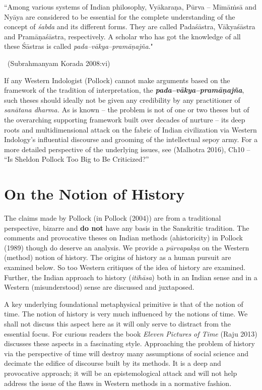 \begin{myquote}
“Among various systems of Indian philosophy, Vyākaraṇa, Pūrva – Mīmāṁsā and Nyāya are considered to be essential for the complete understanding of the concept of \textit{śabda} and its different forms. They are called Padaśāstra, Vākyaśāstra and Pramāṇaśāstra, respectively. A scholar who has got the knowledge of all these Śāstras is called \textit{pada–vākya–pramāṇajña}."

~\hfill (Subrahmanyam Korada 2008:vi)
\end{myquote}

If any Western Indologist (Pollock) cannot make arguments based on the framework of the tradition of interpretation, the \textit{\textbf{pada–vākya–pramāṇajña}}, such theses should ideally not be given any credibility by any practitioner of \textit{sanātana dharma.} As is known – the problem is not of one or two theses but of the overarching supporting framework built over decades of nurture – its deep roots and multidimensional attack on the fabric of Indian civilization via Western Indology’s influential discourse and grooming of the intellectual sepoy army. For a more detailed perspective of the underlying issues, see (Malhotra 2016), Ch10 – “Is Sheldon Pollock Too Big to Be Criticized?”


\section*{On the Notion of History}

\vskip -5pt

The claims made by Pollock (in Pollock (2004)) are from a traditional perspective, bizarre and \textbf{do not} have any basis in the Sanskritic tradition. The comments and provocative theses on Indian methods (ahistoricity) in Pollock (1989) though do deserve an analysis. We provide a \textit{pūrvapakṣa} on the Western (method) notion of history. The origins of history as a human pursuit are examined below. So too Western critiques of the idea of history are examined. Further, the Indian approach to history (\textit{itihāsa}) both in an Indian sense and in a Western (misunderstood) sense are discussed and juxtaposed.

A key underlying foundational metaphysical primitive is that of the notion of time. The notion of history is very much influenced by the notions of time. We shall not discuss this aspect here as it will only serve to distract from the essential focus. For curious readers the book \textit{Eleven Pictures of Time} (Raju 2013) discusses these aspects in a fascinating style. Approaching the problem of history via the perspective of time will destroy many assumptions of social science and decimate the edifice of discourse built by its methods. It is a deep and provocative approach; it will be an epistemological attack and will not help address the issue of the flaws in Western methods in a normative fashion.


